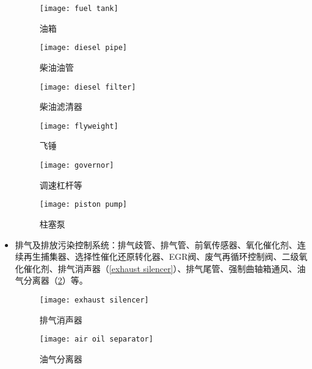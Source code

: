 \documentclass[UTF8]{ctexart}
\numberwithin{figure}{section}
\numberwithin{table}{section}
\begin{document}
\begin{itemize}
	      \begin{figure}[htbp]
		      \centering
		      \begin{minipage}[b]{0.34\textwidth}
			      \centering
			      \texttt{[image: fuel tank]}
			      \caption{油箱}
			      \label{fuel tank}
		      \end{minipage}
		      \begin{minipage}[b]{0.35\textwidth}
			      \centering
			      \texttt{[image: diesel pipe]}
			      \caption{柴油油管}
			      \label{diesel pipe}
		      \end{minipage}
		      \begin{minipage}[b]{0.25\textwidth}
			      \centering
			      \texttt{[image: diesel filter]}
			      \caption{柴油滤清器}
			      \label{diesel filter}
		      \end{minipage}
		      \begin{minipage}[b]{0.35\textwidth}
			      \centering
			      \texttt{[image: flyweight]}
			      \caption{飞锤}
			      \label{flyweight}
		      \end{minipage}
		      \begin{minipage}[b]{0.24\textwidth}
			      \centering
			      \texttt{[image: governor]}
			      \caption{调速杠杆等}
			      \label{governor}
		      \end{minipage}
		      \begin{minipage}[b]{0.35\textwidth}
			      \centering
			      \texttt{[image: piston pump]}
			      \caption{柱塞泵}
			      \label{piston pump}
		      \end{minipage}
	      \end{figure}

	\item 排气及排放污染控制系统：排气歧管、排气管、前氧传感器、氧化催化剂、连续再生捕集器、选择性催化还原转化器、EGR阀、废气再循环控制阀、二级氧化催化剂、排气消声器（\cref{exhaust silencer}）、排气尾管、强制曲轴箱通风、油气分离器（\cref{air oil separator}）等。

	      \begin{figure}[htbp]
		      \centering
		      \begin{minipage}[b]{0.3\textwidth}
			      \centering
			      \texttt{[image: exhaust silencer]}
			      \caption{排气消声器}
			      \label{exhaust silencer}
		      \end{minipage}
		      \begin{minipage}[b]{0.5\textwidth}
			      \centering
			      \texttt{[image: air oil separator]}
			      \caption{油气分离器}
			      \label{air oil separator}
		      \end{minipage}
	      \end{figure}


\end{itemize}
\end{document}
